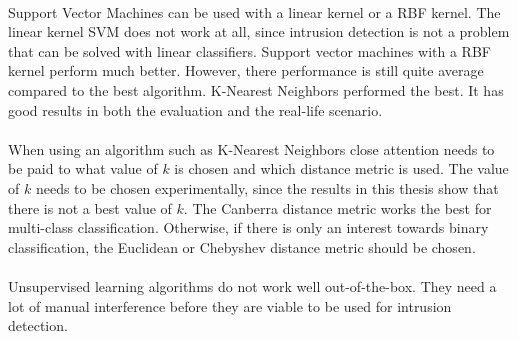 \\
Support Vector Machines can be used with a linear kernel or a RBF kernel. The linear kernel SVM does not work at all, since intrusion detection is not a problem that can be solved with linear classifiers. Support vector machines with a RBF kernel perform much better. However, there performance is still quite average compared to the best algorithm. K-Nearest Neighbors performed the best. It has good results in both the evaluation and the real-life scenario.\\
\\
When using an algorithm such as K-Nearest Neighbors close attention needs to be paid to what value of $k$ is chosen and which distance metric is used. The value of $k$ needs to be chosen experimentally, since the results in this thesis show that there is not a best value of $k$. The Canberra distance metric works the best for multi-class classification. Otherwise, if there is only an interest towards binary classification, the Euclidean or Chebyshev distance metric should be chosen. \\
\\
Unsupervised learning algorithms do not work well out-of-the-box. They need a lot of manual interference before they are viable to be used for intrusion detection. 

